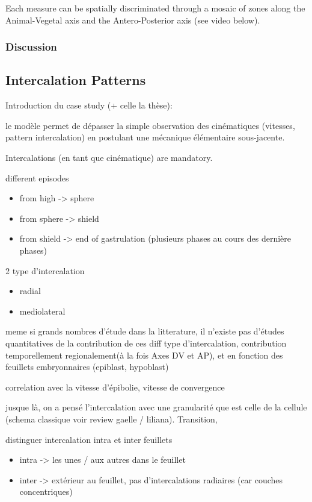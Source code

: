   Each measure can be spatially discriminated through a mosaic of zones along the Animal-Vegetal axis and the Antero-Posterior axis (see video below).  



\subsubsection{Discussion  }

\subsection{Intercalation Patterns  }

  Introduction du case study (+ celle la thèse): 

  le modèle permet de dépasser la simple observation des cinématiques (vitesses, pattern intercalation) en postulant une mécanique élémentaire sous-jacente. 

  Intercalations (en tant que cinématique) are mandatory. 

  different episodes 
\begin{itemize}
	\item from high -> sphere
	\item from sphere -> shield
	\item from shield -> end of gastrulation (plusieurs phases au cours des dernière phases)
\end{itemize}

  2 type d'intercalation 
\begin{itemize}
	\item radial
	\item mediolateral
\end{itemize}

  meme si grands nombres d'étude dans la litterature, il n'existe pas d'études quantitatives de la contribution de ces diff type d'intercalation, contribution temporellement regionalement(à la fois Axes DV et AP), et en fonction des feuillets embryonnaires (epiblast, hypoblast)  

  correlation avec la vitesse d'épibolie, vitesse de convergence 

  jusque là, on a pensé l'intercalation avec une granularité que est celle de la cellule (schema classique voir review gaelle / liliana). Transition,  

  distinguer intercalation intra et inter feuillets 
\begin{itemize}
	\item intra -> les unes / aux autres dans le feuillet
	\item inter -> extérieur au feuillet, pas d'intercalations radiaires (car couches concentriques) 
\end{itemize}

